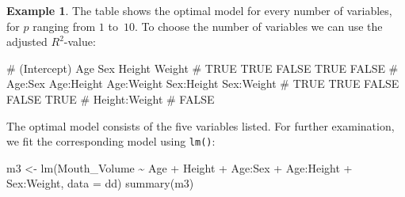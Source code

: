 \documentclass[
  a4paper,
]{article}
\newenvironment{Shaded}{\begin{snugshade}}{\end{snugshade}}
\newcommand{\AttributeTok}[1]{\textcolor[rgb]{0.77,0.63,0.00}{#1}}
\newcommand{\FunctionTok}[1]{\textcolor[rgb]{0.00,0.00,0.00}{#1}}
\newcommand{\NormalTok}[1]{#1}
\newcommand{\OtherTok}[1]{\textcolor[rgb]{0.56,0.35,0.01}{#1}}
\newcommand{\SpecialCharTok}[1]{\textcolor[rgb]{0.00,0.00,0.00}{#1}}
\theoremstyle{definition}
\theoremstyle{definition}
\newtheorem{example}{Example}[section]
\theoremstyle{definition}
\theoremstyle{definition}
\theoremstyle{remark}
\begin{document}
\begin{example}
The table shows the optimal model for every number of variables,
for \(p\) ranging from \(1\) to~\(10\). To choose the number of variables
we can use the adjusted \(R^2\)-value:

\begin{Shaded}
\end{Shaded}

\begin{Shaded}
\begin{Highlighting}[]
\NormalTok{\#   (Intercept)           Age           Sex        Height        Weight }
\NormalTok{\#          TRUE          TRUE         FALSE          TRUE         FALSE }
\NormalTok{\#       Age:Sex    Age:Height    Age:Weight    Sex:Height    Sex:Weight }
\NormalTok{\#          TRUE          TRUE         FALSE         FALSE          TRUE }
\NormalTok{\# Height:Weight }
\NormalTok{\#         FALSE}
\end{Highlighting}
\end{Shaded}

The optimal model consists of the five variables listed. For further
examination, we fit the corresponding model using \texttt{lm()}:

\begin{Shaded}
\begin{Highlighting}[]
\NormalTok{m3 }\OtherTok{\textless{}{-}} \FunctionTok{lm}\NormalTok{(Mouth\_Volume}
         \SpecialCharTok{\textasciitilde{}}\NormalTok{ Age }\SpecialCharTok{+}\NormalTok{ Height }\SpecialCharTok{+}\NormalTok{ Age}\SpecialCharTok{:}\NormalTok{Sex }\SpecialCharTok{+}\NormalTok{ Age}\SpecialCharTok{:}\NormalTok{Height }\SpecialCharTok{+}\NormalTok{ Sex}\SpecialCharTok{:}\NormalTok{Weight,}
         \AttributeTok{data =}\NormalTok{ dd)}
\FunctionTok{summary}\NormalTok{(m3)}
\end{Highlighting}
\end{Shaded}


\end{example}
\end{document}
